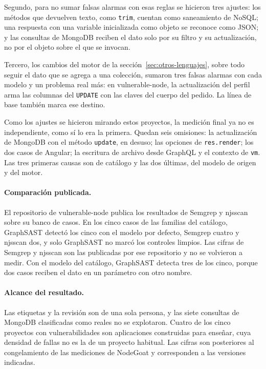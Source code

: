 Segundo, para no sumar falsas alarmas con esas reglas se hicieron tres
ajustes: los métodos que devuelven texto, como \texttt{trim}, cuentan
como saneamiento de NoSQL; una respuesta con una variable inicializada
como objeto se reconoce como JSON; y las consultas de MongoDB reciben el
dato solo por su filtro y su actualización, no por el objeto sobre el que
se invocan.

Tercero, los cambios del motor de la sección~\ref{sec:otros-lenguajes},
sobre todo seguir el dato que se agrega a una colección, sumaron tres
falsas alarmas con cada modelo y un problema real más: en
vulnerable-node, la actualización del perfil arma las columnas del
\texttt{UPDATE} con las claves del cuerpo del pedido. La línea de base
también marca ese destino.

Como los ajustes se hicieron mirando estos proyectos, la medición final
ya no es independiente, como sí lo era la primera. Quedan seis
omisiones: la actualización de MongoDB con el método \texttt{update}, en
desuso; las opciones de \texttt{res.render}; los dos casos de Angular; la
escritura de archivo desde GraphQL y el contexto de \texttt{vm}. Las tres
primeras causas son de catálogo y las dos últimas, del modelo de origen y
del motor.

\paragraph{Comparación publicada.} El repositorio de vulnerable-node
publica los resultados de Semgrep y njsscan sobre su banco de casos. En
los cinco casos de las familias del catálogo, GraphSAST detectó los
cinco con el modelo por defecto, Semgrep cuatro y njsscan dos, y solo
GraphSAST no marcó los controles limpios. Las cifras de Semgrep y njsscan
son las publicadas por ese repositorio y no se volvieron a medir. Con el
modelo del catálogo, GraphSAST detecta tres de los cinco, porque dos
casos reciben el dato en un parámetro con otro nombre.

\paragraph{Alcance del resultado.} Las etiquetas y la revisión son de una
sola persona, y las siete consultas de MongoDB clasificadas como reales
no se explotaron. Cuatro de los cinco proyectos con vulnerabilidades son
aplicaciones construidas para enseñar, cuya densidad de fallas no es la
de un proyecto habitual. Las cifras son posteriores al congelamiento de
las mediciones de NodeGoat y corresponden a las versiones indicadas.

